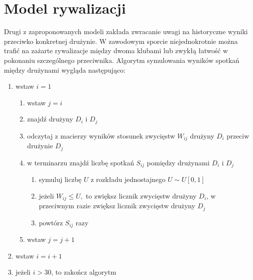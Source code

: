 \documentclass[inzynierska]{pwr_wmat_praca_dyplomowa}
\theoremstyle{plain}
\numberwithin{theorem}{chapter}
\theoremstyle{definition}
\numberwithin{theorem}{chapter}
\begin{document}
\section{Model rywalizacji}
Drugi z zaproponowanych modeli zakłada zwracanie uwagi na historyczne wyniki przeciwko konkretnej drużynie. W zawodowym sporcie niejednokrotnie można trafić na zażarte rywalizacje między dwoma klubami lub zwykłą łatwość w pokonaniu szczególnego przeciwnika. Algorytm symulowania wyników spotkań między drużynami wygląda następująco:
\begin{enumerate}
	\item wstaw $i=1$
	\begin{enumerate}
		\item wstaw $j=i$
		\item znajdź drużyny $D_i$ i $D_j$
		\item odczytaj z macierzy wyników stosunek zwycięstw $W_{ij}$ drużyny $D_i$ przeciw drużynie $D_j$   
		\item w terminarzu znajdź liczbę spotkań $S_{ij}$ pomiędzy drużynami $D_i$ i $D_j$
		\begin{enumerate}
			\item symuluj liczbę $U$ z rozkładu jednostajnego $U\sim U[0,1]$ 
			\item jeżeli $W_{ij} \leq U,$ to zwiększ licznik zwycięstw drużyny $D_i$, w przeciwnym razie zwiększ licznik zwycięstw drużyny $D_j$
			\item powtórz $S_{ij}$ razy
		\end{enumerate}
		\item wstaw $j=j+1$
	\end{enumerate}
	\item wstaw $i=i+1$
	\item jeżeli $i> 30$, to zakończ algorytm
\end{enumerate} 
\end{document}

